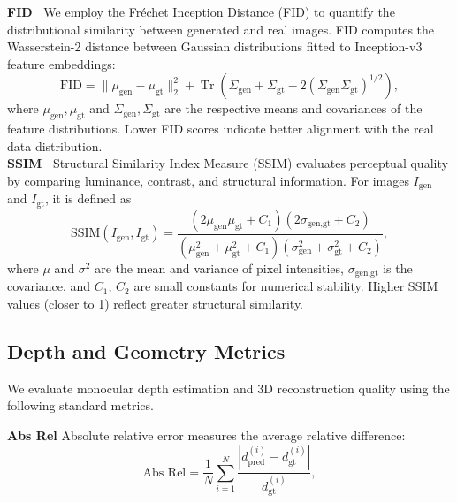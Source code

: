 \noindent\textbf{FID~\cite{heusel2017gans_FID}}
We employ the Fréchet Inception Distance (FID) to quantify the distributional similarity between generated and real images. 
FID computes the Wasserstein-2 distance between Gaussian distributions fitted to Inception-v3 feature embeddings:
\begin{equation}
\text{FID} = \|\mu_{\text{gen}} - \mu_{\text{gt}}\|_2^2 + \operatorname{Tr}\!\left( \Sigma_{\text{gen}} + \Sigma_{\text{gt}} - 2(\Sigma_{\text{gen}} \Sigma_{\text{gt}})^{1/2} \right),
\end{equation}
where \(\mu_{\text{gen}}, \mu_{\text{gt}}\) and \(\Sigma_{\text{gen}}, \Sigma_{\text{gt}}\) are the respective means and covariances of the feature distributions. 
Lower FID scores indicate better alignment with the real data distribution.
\\

\noindent\textbf{SSIM~\cite{wang2004image_ssim}}
Structural Similarity Index Measure (SSIM) evaluates perceptual quality by comparing luminance, contrast, and structural information. 
For images \(I_{\text{gen}}\) and \(I_{\text{gt}}\), it is defined as
\begin{equation}
\text{SSIM}(I_{\text{gen}}, I_{\text{gt}}) = \frac{(2\mu_{\text{gen}}\mu_{\text{gt}} + C_1)(2\sigma_{\text{gen,gt}} + C_2)}{(\mu_{\text{gen}}^2 + \mu_{\text{gt}}^2 + C_1)(\sigma_{\text{gen}}^2 + \sigma_{\text{gt}}^2 + C_2)},
\end{equation}
where \(\mu\) and \(\sigma^2\) are the mean and variance of pixel intensities, \(\sigma_{\text{gen,gt}}\) is the covariance, and \(C_1\), \(C_2\) are small constants for numerical stability. 
Higher SSIM values (closer to 1) reflect greater structural similarity.
\\

\subsection{Depth and Geometry Metrics}
We evaluate monocular depth estimation and 3D reconstruction quality using the following standard metrics.

\noindent\textbf{Abs Rel} \quad Absolute relative error measures the average relative difference:
\begin{equation}
\text{Abs Rel} = \frac{1}{N}\sum_{i=1}^{N} \frac{|d_{\text{pred}}^{(i)} - d_{\text{gt}}^{(i)}|}{d_{\text{gt}}^{(i)}},
\end{equation}
\\

